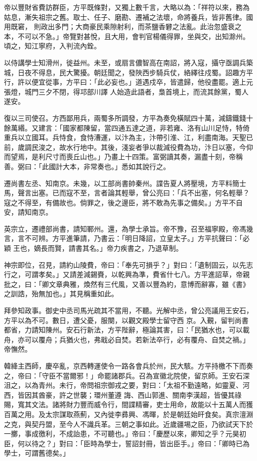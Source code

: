 \begin{pinyinscope}
 帝以豐財省費訪群臣，方平既條對，又獨上數千言，大略以為：「祥符以來，務為姑息，漸失祖宗之舊。取士、任子、磨勘、遷補之法壞，命將養兵，皆非舊律。國用既窘，
 則政出多門；大商豪民乘隙射利，而茶鹽香礬之法亂。此治忽盛衰之本，不可以不急。」帝覽對甚悅，且大用，會判官楊儀得罪，坐與交，出知滁州。頃之，知江寧府，入判流內銓。



 以侍講學士知滑州，徙益州。未至，或扇言儂智高在南詔，將入寇，攝守亟調兵築城，日夜不得息，民大驚擾。朝廷聞之，發陜西步騎兵仗，絡繹往戍蜀。詔趣方平行，許以便宜從事，方平曰：「此必妄也。」道遇戍卒，皆遣歸，他役盡罷。適上元張燈，城門三夕不閉，得邛部川譯
 人始造此語者，梟首境上，而流其餘黨，蜀人遂安。



 復以三司使召。方西鄙用兵，兩蜀多所調發，方平為奏免橫賦四十萬，減鑄鐵錢十餘萬緡。又建言：「國家都陳留，當四通五達之道，非若雍、洛有山川足恃，特倚重兵以立國耳。兵恃食，食恃漕運，以汴為主，汴帶引淮、江，利盡南海。天聖已前，歲調民浚之，故水行地中。其後，淺妄者爭以裁減役費為功，汴日以塞，今仰而望焉，是利尺寸而喪丘山也。」乃畫上十四策。富弼讀其奏，漏盡十刻，帝稱
 善。弼曰：「此國計大本，非常奏也。」悉如其說行之。



 遷尚書左丞、知南京。未幾，以工部尚書帥秦州。諜告夏人將壓境，方平料簡士馬，聲言出塞。已而寇不至，言者論其輕舉，曾公亮曰：「兵不出塞，何名輕舉？寇之不得至，有備故也。倘罪之，後之邊臣，將不敢為先事之備矣。」方平不自安，請知南京。



 英宗立，遷禮部尚書，請知鄆州。還，為學士承旨。帝不豫，召至福寧殿，帝馮幾言，言不可辨。方平進筆請，乃書云：「明日降詔，立皇太子。」方平抗聲曰：「必穎
 王也，嫡長而賢，請書其名。」帝力疾書之，乃退草制。



 神宗即位，召見，請約山陵費，帝曰：「奉先可損乎？」對曰：「遺制固云，以先志行之，可謂孝矣。」又請差減錫賚，以乾興為準，費省什七八。方平進詔草，帝親批之，曰：「卿文章典雅，煥然有三代風，又善以豐為約，意博而辭寡，雖《書》之訓誥，殆無加也。」其見稱重如此。



 拜參知政事。御史中丞司馬光疏其不當用，不聽。光解中丞，曾公亮議用王安石，方平以為不可。數日，遭父憂，服闋，以觀文殿學士留守西
 京。入覲，留判尚書都省，力請知陳州。安石行新法，方平陛辭，極論其害，曰：「民猶水也，可以載舟，亦可以覆舟；兵猶火也，弗戢必自焚。若新法卒行，必有覆舟、自焚之禍。」帝憮然。



 韓絳主西師，慶卒亂，京西轉運使令一路各會兵於州，民大駭。方平持檄不下而奏之，帝曰：「守臣不當爾邪！」命罷諸郡兵。召為宣徽北院使，留京師。王安石深沮之，以為青州。未行，帝問祖宗御戎之要，對曰：「太祖不勤遠略，如靈夏、河西，皆因其酋豪，許之世襲；環州董遵
 誨、西山郭進、關南李漢超，皆優其祿賜，寬其文法。諸將財力豐而威令行，間諜精審，吏士用命，故能以十五萬人而獲百萬之用。及太宗謀取燕薊，又內徙李彞興、馮暉，於是朝廷始旰食矣。真宗澶淵之克，與契丹盟，至今人不識兵革。三朝之事如此。近歲疆埸之臣，乃欲試天下於一擲，事成徼利，不成詒患，不可聽也。」帝曰：「慶歷以來，卿知之乎？元昊初臣，何以待之？」對曰：「臣時為學士，誓詔封冊，皆出臣手。」帝曰：「卿時已為學士，可謂舊德矣。」




\end{pinyinscope}
